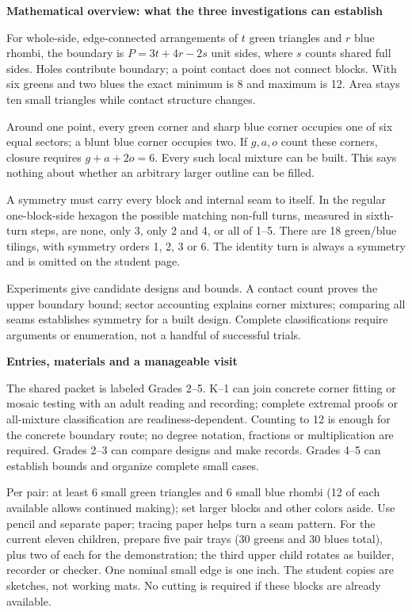 \documentclass[11pt]{article}
\newcommand\lead[1]{\textbf{#1}\par}
\begin{document}
\lead{Mathematical overview: what the three investigations can establish}
For whole-side, edge-connected arrangements of $t$ green triangles and $r$ blue rhombi, the boundary is $P=3t+4r-2s$ unit sides, where $s$ counts shared full sides. Holes contribute boundary; a point contact does not connect blocks. With six greens and two blues the exact minimum is 8 and maximum is 12. Area stays ten small triangles while contact structure changes.

Around one point, every green corner and sharp blue corner occupies one of six equal sectors; a blunt blue corner occupies two. If $g,a,o$ count these corners, closure requires $g+a+2o=6$. Every such local mixture can be built. This says nothing about whether an arbitrary larger outline can be filled.

A symmetry must carry every block and internal seam to itself. In the regular one-block-side hexagon the possible matching non-full turns, measured in sixth-turn steps, are none, only 3, only 2 and 4, or all of 1--5. There are 18 green/blue tilings, with symmetry orders 1, 2, 3 or 6. The identity turn is always a symmetry and is omitted on the student page.

Experiments give candidate designs and bounds. A contact count proves the upper boundary bound; sector accounting explains corner mixtures; comparing all seams establishes symmetry for a built design. Complete classifications require arguments or enumeration, not a handful of successful trials.

\lead{Entries, materials and a manageable visit}
The shared packet is labeled Grades 2--5. K--1 can join concrete corner fitting or mosaic testing with an adult reading and recording; complete extremal proofs or all-mixture classification are readiness-dependent. Counting to 12 is enough for the concrete boundary route; no degree notation, fractions or multiplication are required. Grades 2--3 can compare designs and make records. Grades 4--5 can establish bounds and organize complete small cases.

Per pair: at least 6 small green triangles and 6 small blue rhombi (12 of each available allows continued making); set larger blocks and other colors aside. Use pencil and separate paper; tracing paper helps turn a seam pattern. For the current eleven children, prepare five pair trays (30 greens and 30 blues total), plus two of each for the demonstration; the third upper child rotates as builder, recorder or checker. One nominal small edge is one inch. The student copies are sketches, not working mats. No cutting is required if these blocks are already available.
\end{document}
